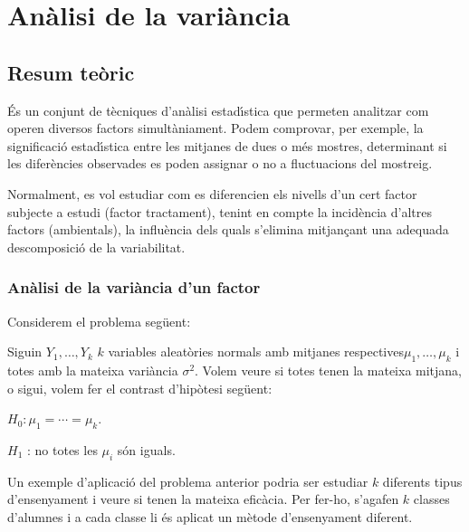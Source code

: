 \chapter{An\`alisi de la vari\`ancia}

\section{Resum te\`oric}

\'Es un conjunt de t\`ecniques d'an\`alisi estad\'{\i}stica que permeten analitzar com
operen diversos factors simult\`aniament. Podem comprovar, per exemple, la
significaci\'o estad\'{\i}stica
entre les mitjanes de dues o m\'es mostres, determinant si
les difer\`encies observades es poden assignar o no a fluctuacions del mostreig.

Normalment, es vol estudiar com es diferencien els nivells
 d'un cert factor
subjecte a estudi (factor tractament), tenint en compte la incid\`encia d'altres
factors (ambientals), la influ\`encia dels quals s'elimina 
mitjan\c cant una adequada descomposici\'o de la variabilitat.

\subsection{An\`alisi de la vari\`ancia d'un factor}

Considerem el problema seg\"uent:

Siguin $Y_1, \ldots , Y_k$ $k$ variables aleat\`ories normals amb mitjanes
respectives\break $\mu_1, \ldots , \mu_k$ i totes amb la 
mateixa vari\`ancia
$\sigma^2$. Volem veure si totes tenen la mateixa mitjana, o sigui, volem fer el
contrast d'hip\`otesi seg\"uent:

\begin{description}
\item $H_0 : \mu_1 = \cdots = \mu_k$.
\item $H_1$ : no totes les $\mu_i$ s\'on iguals.
\end{description}

Un exemple d'aplicaci\'o del problema anterior podria ser estudiar $k$ diferents
tipus d'ensenyament i veure si tenen la mateixa efic\`acia.
 Per fer-ho, s'agafen
$k$ classes d'alumnes i a cada classe li \'es aplicat
un m\`etode d'ensenyament
diferent.

